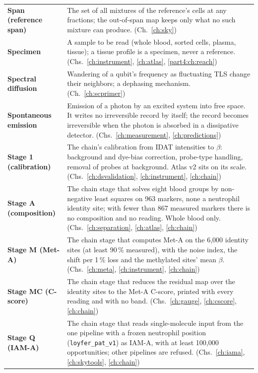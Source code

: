 {\begin{longtable}{@{}>{\raggedright\arraybackslash}p{}>{\raggedright\arraybackslash}p{}@{}}
\textbf{Span (reference span)} & The set of all mixtures of the reference's cells at any fractions; the out-of-span map keeps only what no such mixture can produce. {\footnotesize(Ch.~\ref{ch:sky})}\\[1pt]
\textbf{Specimen} & A sample to be read (whole blood, sorted cells, plasma, tissue); a tissue profile is a specimen, never a reference. {\footnotesize(Chs.~\ref{ch:instrument}, \ref{ch:atlas}, \ref{part4:ch:reach})}\\[1pt]
\textbf{Spectral diffusion} & Wandering of a qubit's frequency as fluctuating TLS change their neighbors; a dephasing mechanism. {\footnotesize(Ch.~\ref{ch:scprimer})}\\[1pt]
\textbf{Spontaneous emission} & Emission of a photon by an excited system into free space. It writes no irreversible record by itself; the record becomes irreversible when the photon is absorbed in a dissipative detector. {\footnotesize(Chs.~\ref{ch:measurement}, \ref{ch:predictions})}\\[1pt]
\textbf{Stage 1 (calibration)} & The chain's calibration from IDAT intensities to $\beta$: background and dye-bias correction, probe-type handling, removal of probes at background. Atlas v2 sits on its scale. {\footnotesize(Chs.~\ref{ch:dsvalidation}, \ref{ch:instrument}, \ref{ch:chain})}\\[1pt]
\textbf{Stage A (composition)} & The chain stage that solves eight blood groups by non-negative least squares on 963 markers, none a neutrophil identity site; with fewer than 867 measured markers there is no composition and no reading. Whole blood only. {\footnotesize(Chs.~\ref{ch:separation}, \ref{ch:atlas}, \ref{ch:chain})}\\[1pt]
\textbf{Stage M (Met-A)} & The chain stage that computes Met-A on the 6,000 identity sites (at least 90\,\% measured), with the noise index, the shift per 1\,\% loss and the methylated sites' mean $\beta$. {\footnotesize(Chs.~\ref{ch:meta}, \ref{ch:instrument}, \ref{ch:chain})}\\[1pt]
\textbf{Stage MC (C-score)} & The chain stage that reduces the residual map over the identity sites to the Met-A C-score, printed with every reading and with no band. {\footnotesize(Chs.~\ref{ch:gauge}, \ref{ch:cscore}, \ref{ch:chain})}\\[1pt]
\textbf{Stage Q (IAM-A)} & The chain stage that reads single-molecule input from the one pipeline with a frozen neutrophil position (\texttt{loyfer\_pat\_v1}) as IAM-A, with at least 100,000 opportunities; other pipelines are refused. {\footnotesize(Chs.~\ref{ch:iama}, \ref{ch:skytools}, \ref{ch:chain})}\\[1pt]

\end{longtable}}
